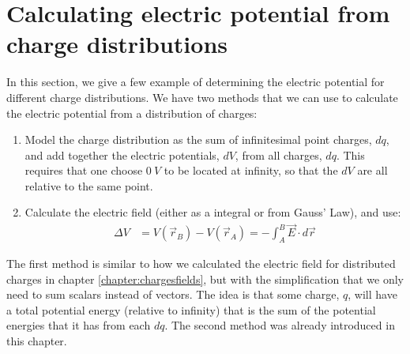 \section{Calculating electric potential from charge distributions}
In this section, we give a few example of determining the electric potential for different charge distributions. We have two methods that we can use to calculate the electric potential from a distribution of charges:
\begin{enumerate}
\item Model the charge distribution as the sum of infinitesimal point charges, $dq$, and add together the electric potentials, $dV$, from all charges, $dq$. This requires that one choose $\SI{0}{V}$ to be located at infinity, so that the $dV$ are all relative to the same point.
\item Calculate the electric field (either as a integral or from Gauss' Law), and use:
\begin{align*}
\Delta V &=V(\vec r_B)-V(\vec r_A)=-\int_A^B  \vec E\cdot d\vec r
\end{align*}
\end{enumerate}
The first method is similar to how we calculated the electric field for distributed charges in chapter \ref{chapter:chargesfields}, but with the simplification that we only need to sum scalars instead of vectors. The idea is that some charge, $q$, will have a total potential energy (relative to infinity) that is the sum of the potential energies that it has from each $dq$. The second method was already introduced in this chapter.
